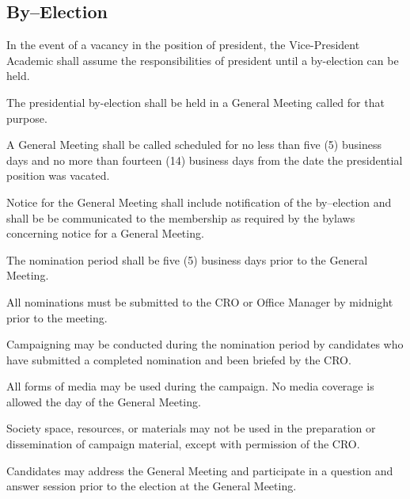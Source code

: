 \subsection {By--Election}
\begin{longenum}[ label*=\thesubsection.\arabic*., align=left]
	\item In the event of a vacancy in the position of president, the Vice-President Academic shall assume the responsibilities of president until a by-election can be held.
	\item The presidential by-election shall be held in a General Meeting called for that purpose.
	\item A General Meeting shall be called scheduled for no less than five (5) business days and no more than fourteen (14) business days from the date the presidential position was vacated. 
	\item Notice for the General Meeting shall include notification of the by--election and shall be be communicated to the membership as required by the bylaws concerning notice for a General Meeting.
	\item The nomination period shall be five (5) business days prior to the General Meeting.
	\item All nominations must be submitted to the CRO or Office Manager by midnight prior to the meeting.
	\item Campaigning may be conducted during the nomination period by candidates who have submitted a completed nomination and been briefed by the CRO.
	\item All forms of media may be used during the campaign. No media coverage is allowed the day of the General Meeting.  
	\item Society space, resources, or materials may not be used in the preparation or dissemination of campaign material, except with permission of the CRO.
	\item Candidates may address the General Meeting and participate in a question and answer session prior to the election at the General Meeting.

\end{longenum}
